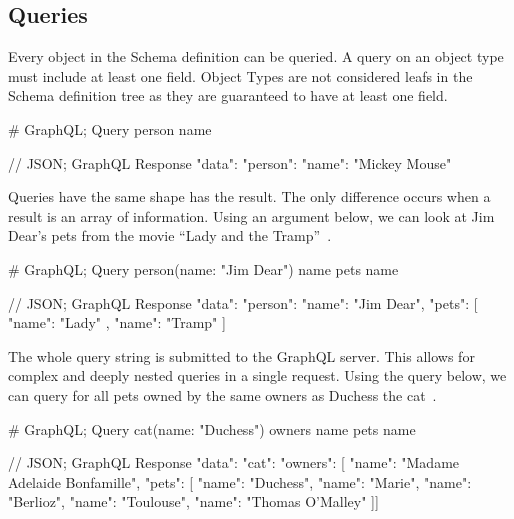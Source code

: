 \documentclass[stat,dissertation]{puthesis}\usepackage[]{graphicx}\usepackage{xcolor}
\begin{document}
\subsection{Queries}

Every object in the Schema definition can be queried.  A query on an object type must include at least one field.  Object Types are not considered leafs in the Schema definition tree as they are guaranteed to have at least one field.

\begin{graphqlcode}
# GraphQL; Query
{
  person {
    name
  }
}
\end{graphqlcode}
\begin{jscode}
// JSON; GraphQL Response
{
  "data":{
    "person": {
      "name": "Mickey Mouse"
    }}}
\end{jscode}

Queries have the same shape has the result.  The only difference occurs when a result is an array of information.  Using an  argument below, we can look at Jim Dear's pets from the movie ``Lady and the Tramp''~\cite{jimdear}.

\begin{graphqlcode}
# GraphQL; Query
{
  person(name: "Jim Dear") {
    name
    pets {
      name
    }}}
\end{graphqlcode}
\begin{jscode}
// JSON; GraphQL Response
{
  "data":{
    "person": {
      "name": "Jim Dear",
      "pets": [
        { "name": "Lady" },
        { "name": "Tramp" }
      ]}}}
\end{jscode}


The whole query string is submitted to the GraphQL server.  This allows for complex and deeply nested queries in a single request.  Using the query below, we can query for all pets owned by the same owners as Duchess the cat~\cite{madame}.

\begin{graphqlcode}
# GraphQL; Query
{
  cat(name: "Duchess") {
    owners {
      name
      pets {
        name
      }}}}
\end{graphqlcode}
\begin{jscode}
// JSON; GraphQL Response
{
  "data": {
    "cat": {
      "owners": [{
        "name": "Madame Adelaide Bonfamille",
        "pets": [
          {"name": "Duchess"},
          {"name": "Marie"},
          {"name": "Berlioz"},
          {"name": "Toulouse"},
          {"name": "Thomas O'Malley"}
        ]}]}}}
\end{jscode}
\end{document}
